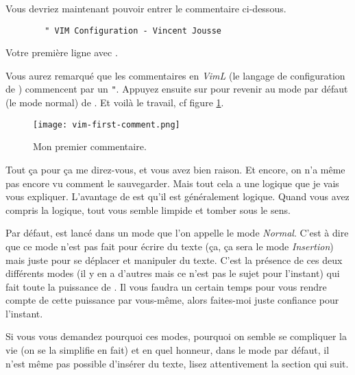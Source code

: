 Vous devriez maintenant pouvoir entrer le commentaire ci-dessous.
\begin{listing}[H]

    \begin{verbatim}
        " VIM Configuration - Vincent Jousse
    \end{verbatim}
    \caption{Votre première ligne avec \vim.}
    \label{code:first-comment}
\end{listing}

Vous aurez remarqué que les commentaires en \emph{VimL} (le langage de configuration de \vim) commencent par un \Verb|"|. Appuyez ensuite sur \ttesc pour revenir au mode par défaut (le mode normal) de \vim. Et voilà le travail, cf figure \ref{fig:vim-first-comment}.

\begin{figure}%
  \texttt{[image: vim-first-comment.png]}
  \caption{Mon premier commentaire.}
  \label{fig:vim-first-comment}
\end{figure}

Tout ça pour ça me direz-vous, et vous avez bien raison. Et encore, on n'a même pas encore vu comment le sauvegarder. Mais tout cela a une logique que je vais vous expliquer. L'avantage de \vim est qu'il est généralement logique. Quand vous avez compris la logique, tout vous semble limpide et tomber sous le sens.

Par défaut, \vim est lancé dans un mode que l'on appelle le mode \emph{Normal}. C'est à dire que ce mode n'est pas fait pour écrire du texte (ça, ça sera le mode \emph{Insertion}) mais juste pour se déplacer et manipuler du texte. C'est la présence de ces deux différents modes (il y en a d'autres mais ce n'est pas le sujet pour l'instant) qui fait toute la puissance de \vim. Il vous faudra un certain temps pour vous rendre compte de cette puissance par vous-même, alors faites-moi juste confiance pour l'instant.

Si vous vous demandez pourquoi ces modes, pourquoi on semble se compliquer la vie (on se la simplifie en fait) et en quel honneur, dans le mode par défaut, il n'est même pas possible d'insérer du texte, lisez attentivement la section qui suit.

